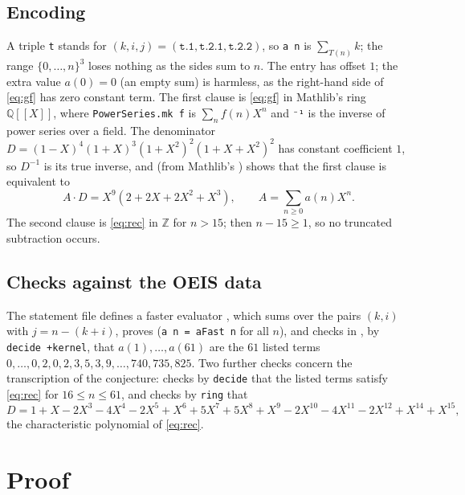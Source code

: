 \documentclass[11pt]{amsart}
\theoremstyle{plain}
\theoremstyle{definition}
\newcommand{\Q}{\mathbb{Q}}
\newcommand{\Z}{\mathbb{Z}}
\newcommand{\Qx}{\Q[\![X]\!]}
\begin{document}
\subsection*{Encoding}
A triple \texttt{t} stands for $(k,i,j)=(\texttt{t.1},\texttt{t.2.1},\texttt{t.2.2})$, so \texttt{a n} is $\sum_{T(n)}k$; the range $\{0,\dots,n\}^3$ loses nothing as the sides sum to $n$.
The entry has offset $1$; the extra value $a(0)=0$ (an empty sum) is harmless, as the right-hand side of \eqref{eq:gf} has zero constant term.
The first clause is \eqref{eq:gf} in Mathlib's ring $\Qx$, where \texttt{PowerSeries.mk f} is $\sum_n f(n)X^n$ and \texttt{⁻¹} is the inverse of power series over a field.
The denominator $D=(1-X)^4(1+X)^3(1+X^2)^2(1+X+X^2)^2$ has constant coefficient $1$, so $D^{-1}$ is its true inverse, and  (from Mathlib's ) shows that the first clause is equivalent to
\begin{equation}\label{eq:AD}
  A\cdot D = X^9(2+2X+2X^2+X^3),\qquad A=\textstyle\sum_{n\ge0}a(n)X^n .
\end{equation}
The second clause is \eqref{eq:rec} in $\Z$ for $n>15$; then $n-15\ge1$, so no truncated subtraction occurs.

\subsection*{Checks against the OEIS data}
The statement file defines a faster evaluator , which sums over the pairs $(k,i)$ with $j=n-(k+i)$, proves  (\texttt{a n = aFast n} for all $n$), and checks in , by \texttt{decide +kernel}, that $a(1),\dots,a(61)$ are the $61$ listed terms $0,\dots,0,2,0,2,3,5,3,9,\dots,740,735,825$.
Two further checks concern the transcription of the conjecture:  checks by \texttt{decide} that the listed terms satisfy \eqref{eq:rec} for $16\le n\le61$, and  checks by \texttt{ring} that
\begin{equation}\label{eq:den}
  D = 1 + X - 2X^3 - 4X^4 - 2X^5 + X^6 + 5X^7 + 5X^8 + X^9 - 2X^{10} - 4X^{11} - 2X^{12} + X^{14} + X^{15},
\end{equation}
the characteristic polynomial of \eqref{eq:rec}.

\section{Proof}\label{sec:proof}
\end{document}
